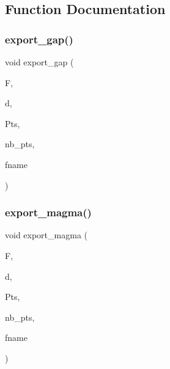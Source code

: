 \subsection{Function Documentation}
\mbox{\label{make__something_8_c_a2df5ce810ead281d3e2c885149bcfb7c}} 
\subsubsection{\texorpdfstring{export\+\_\+gap()}{export\_gap()}}
{\footnotesize\ttfamily void export\+\_\+gap (\begin{DoxyParamCaption}\item[{\mbox{\hyperlink{classfinite__field}{finite\+\_\+field}} $\ast$}]{F,  }\item[{\mbox{\hyperlink{galois_8h_a09fddde158a3a20bd2dcadb609de11dc}{I\+NT}}}]{d,  }\item[{\mbox{\hyperlink{galois_8h_a09fddde158a3a20bd2dcadb609de11dc}{I\+NT}} $\ast$}]{Pts,  }\item[{\mbox{\hyperlink{galois_8h_a09fddde158a3a20bd2dcadb609de11dc}{I\+NT}}}]{nb\+\_\+pts,  }\item[{\mbox{\hyperlink{galois_8h_ab6cc7b4aeb6ea31aba2b3fbfc83ff5e6}{B\+Y\+TE}} $\ast$}]{fname }\end{DoxyParamCaption})}

\mbox{\label{make__something_8_c_a24d47d809bb1982155fab1fa6e86b7b6}} 
\subsubsection{\texorpdfstring{export\+\_\+magma()}{export\_magma()}}
{\footnotesize\ttfamily void export\+\_\+magma (\begin{DoxyParamCaption}\item[{\mbox{\hyperlink{classfinite__field}{finite\+\_\+field}} $\ast$}]{F,  }\item[{\mbox{\hyperlink{galois_8h_a09fddde158a3a20bd2dcadb609de11dc}{I\+NT}}}]{d,  }\item[{\mbox{\hyperlink{galois_8h_a09fddde158a3a20bd2dcadb609de11dc}{I\+NT}} $\ast$}]{Pts,  }\item[{\mbox{\hyperlink{galois_8h_a09fddde158a3a20bd2dcadb609de11dc}{I\+NT}}}]{nb\+\_\+pts,  }\item[{\mbox{\hyperlink{galois_8h_ab6cc7b4aeb6ea31aba2b3fbfc83ff5e6}{B\+Y\+TE}} $\ast$}]{fname }\end{DoxyParamCaption})}

